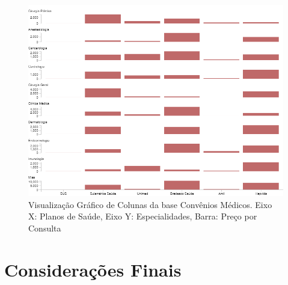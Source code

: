 \documentclass[
	12pt,				%
	openright,			%
	twoside,			%
	a4paper,			%
	english,			%
	brazil				%
	]{abntex2}
\begin{document}
	\begin{figure}[h!]
		\centering
		\includegraphics[width=\linewidth]{./figures/Resultados/BCCM.png}
		\caption{Visualização Gráfico de Colunas da base Convênios Médicos. Eixo X: Planos de Saúde, Eixo Y: Especialidades, Barra: Preço por Consulta}
		\label{fig:BCCM}
	\end{figure}
	

\chapter{Considerações Finais}
\end{document}
